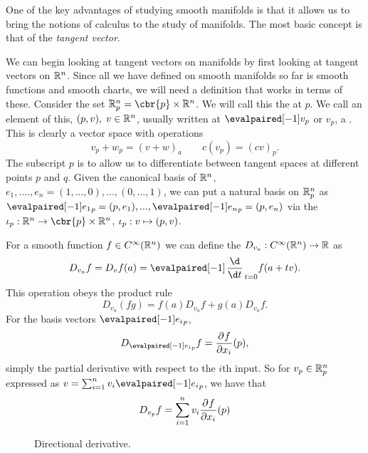 One of the key advantages of studying smooth manifolds is that it allows us to bring the notions of calculus to the study of manifolds.
The most basic concept is that of the \emph{tangent vector}.

We can begin looking at tangent vectors on manifolds by first looking at tangent vectors on \(\mathbb{R}^n\).
Since all we have defined on smooth manifolds so far is smooth functions and smooth charts, we will need a definition that works in terms of these.
Consider the set \(\R^n_p = \cbr{p}\x \R^n\).
We will call this the  at \(p\).
We call an element of this, \((p, v), \; v\in \mathbb{R}^n\), usually written at \(\eval{v}_p\) or \(v_p\), a .
This is clearly a vector space with operations \[v_p + w_p = (v + w)_a \quad\quad c(v_p) = (cv)_p.\]
The subscript \(p\) is to allow us to differentiate between tangent spaces at different points \(p\) and \(q\).
Given the canonical basis of \(\mathbb{R}^n\), \(e_1, .
..., e_n = (1, ..., 0), ..., (0, ..., 1)\), we can put a natural basis on \(\mathbb{R}^n_p\) as \(\eval{e_1}_p = (p, e_1), ..., \eval{e_n}_p = (p, e_n)\) via the  \(\inclusion_p: \R^n \to \cbr{p}\x \R^n\), \(\iota_p : v \mapsto (p, v)\).

For a smooth function \(f \in C^\infty(\mathbb{R}^n)\) we can define the  \(D_{v_a}: C^\infty(\mathbb{R}^n) \to \mathbb{R}\) as \[ D_{v_a} f = D_v f(a) = \eval{\od{}{t}}_{t=0} f(a + tv) .\]
This operation obeys the product rule \[ D_{v_a} (fg) = f(a) D_{v_a}f + g(a) D_{v_a}f .\]
For the basis vectors \(\eval{e_i}_p\), \[D_{\eval{e_i}_p} f = \pd{f}{x_i}(p),\] simply the partial derivative with respect to the \(i\)th input.
So for \(v_p \in \mathbb{R}^n_p\) expressed as \(v = \sum_{i=1}^n v_i \eval{e_i}_p\), we have that \[D_{v_p} f = \sum_{i=1}^n v_i \pd{f}{x_i}(p)\] \begin{figure}[h]  \caption{Directional derivative.
	}
\end{figure}

